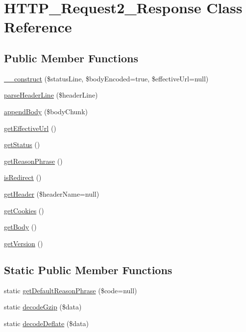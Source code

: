 \hypertarget{classHTTP__Request2__Response}{}\section{H\+T\+T\+P\+\_\+\+Request2\+\_\+\+Response Class Reference}
\label{classHTTP__Request2__Response}
\subsection*{Public Member Functions}
\begin{DoxyCompactItemize}
\item 
\hyperlink{classHTTP__Request2__Response_aaaa2f628e7dbfecfeb775c9ee6c12bdb}{\+\_\+\+\_\+construct} (\$status\+Line, \$body\+Encoded=true, \$effective\+Url=null)
\item 
\hyperlink{classHTTP__Request2__Response_a04cced85d4e024e5f41bb326aeba4bb8}{parse\+Header\+Line} (\$header\+Line)
\item 
\hyperlink{classHTTP__Request2__Response_a9c058efa93fa093f9e2ea3899aaafd81}{append\+Body} (\$body\+Chunk)
\item 
\hyperlink{classHTTP__Request2__Response_ac62d21f48b31db496403da74ec9a9635}{get\+Effective\+Url} ()
\item 
\hyperlink{classHTTP__Request2__Response_a624920600f1cff1d72493c74e945ace3}{get\+Status} ()
\item 
\hyperlink{classHTTP__Request2__Response_aabc673a3430ee9b8ad0e29275b31c655}{get\+Reason\+Phrase} ()
\item 
\hyperlink{classHTTP__Request2__Response_a9f99e1beb096712a7b1ebda78b638b06}{is\+Redirect} ()
\item 
\hyperlink{classHTTP__Request2__Response_a4fcafd1538662af1415ccf12cae68c62}{get\+Header} (\$header\+Name=null)
\item 
\hyperlink{classHTTP__Request2__Response_a1c8c23d204f797dd18a31aa5a9c50414}{get\+Cookies} ()
\item 
\hyperlink{classHTTP__Request2__Response_a2aa534b9ea2994761e3b9260908ad678}{get\+Body} ()
\item 
\hyperlink{classHTTP__Request2__Response_acf2961ff04baa2610df8ca30ea5313b0}{get\+Version} ()
\end{DoxyCompactItemize}
\subsection*{Static Public Member Functions}
\begin{DoxyCompactItemize}
\item 
static \hyperlink{classHTTP__Request2__Response_ae6a45aaf10437d67b4710d61702d9819}{get\+Default\+Reason\+Phrase} (\$code=null)
\item 
static \hyperlink{classHTTP__Request2__Response_aa599a743d6dfcdec596d58f359b22566}{decode\+Gzip} (\$data)
\item 
static \hyperlink{classHTTP__Request2__Response_ae43f4b1062afa9036c71e3c506d5979e}{decode\+Deflate} (\$data)
\end{DoxyCompactItemize}
